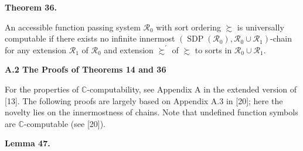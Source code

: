 \documentclass[10pt,a4paper]{amsart}
\begin{document}
 

 
\par\medskip\noindent\textbf{Theorem 36.}\par
 
 
An accessible function passing system $\mathcal{R}_{0}$ with sort ordering $\succsim$ is universally computable if there exists no infinite innermost $(\operatorname{SDP}(\mathcal{R}_{0}),\mathcal{R}_{0}\cup\mathcal{R}_{1})$-chain for any extension $\mathcal{R}_{1}$ of $\mathcal{R}_{0}$ and extension $\succsim^{\prime}$ of $\succsim$ to sorts in $\mathcal{R}_{0}\cup\mathcal{R}_{1}$.\par
 
 

 
\par\medskip\noindent\textbf{A.2 The Proofs of Theorems 14 and 36}\par
 
 
For the properties of $\mathbb{C}$-computability, see Appendix A in the extended version of [13]. The following proofs are largely based on Appendix A.3 in [20]; here the novelty lies on the innermostness of chains. Note that undefined function symbols are $\mathbb{C}$-computable (see [20]).\par
 
 
 
\par\medskip\noindent\textbf{Lemma 47.}\par
 
 
\end{document}
